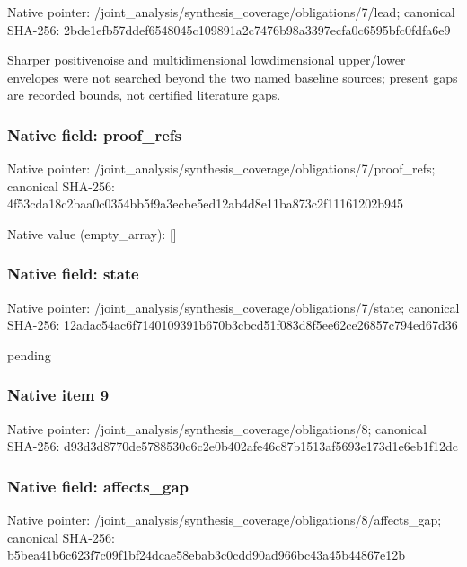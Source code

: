 \documentclass[10pt,a4paper]{article}
\begin{document}
Native pointer: /joint\_analysis/synthesi\allowbreak{}s\_coverage/obligations/7\allowbreak{}/lead; canonical SHA-256: 2bde1efb57ddef6548045c10\allowbreak{}9891a2c7476b98a3397ecfa0\allowbreak{}c6595bfc0fdfa6e9


Sharper positivenoise and multidimensional lowdimensional upper/lower envelopes were not searched beyond the two named baseline sources; present gaps are recorded bounds, not certified literature gaps.


\subsubsection{Native field: proof\_refs}


Native pointer: /joint\_analysis/synthesi\allowbreak{}s\_coverage/obligations/7\allowbreak{}/proof\_refs; canonical SHA-256: 4f53cda18c2baa0c0354bb5f\allowbreak{}9a3ecbe5ed12ab4d8e11ba87\allowbreak{}3c2f11161202b945



Native value (empty\_array): []



\subsubsection{Native field: state}


Native pointer: /joint\_analysis/synthesi\allowbreak{}s\_coverage/obligations/7\allowbreak{}/state; canonical SHA-256: 12adac54ac6f7140109391b6\allowbreak{}70b3cbcd51f083d8f5ee62ce\allowbreak{}26857c794ed67d36


pending


\subsubsection{Native item 9}


Native pointer: /joint\_analysis/synthesi\allowbreak{}s\_coverage/obligations/8; canonical SHA-256: d93d3d8770de5788530c6c2e\allowbreak{}0b402afe46c87b1513af5693\allowbreak{}e173d1e6eb1f12dc



\subsubsection{Native field: affects\_gap}


Native pointer: /joint\_analysis/synthesi\allowbreak{}s\_coverage/obligations/8\allowbreak{}/affects\_gap; canonical SHA-256: b5bea41b6c623f7c09f1bf24\allowbreak{}dcae58ebab3c0cdd90ad966b\allowbreak{}c43a45b44867e12b
\end{document}
